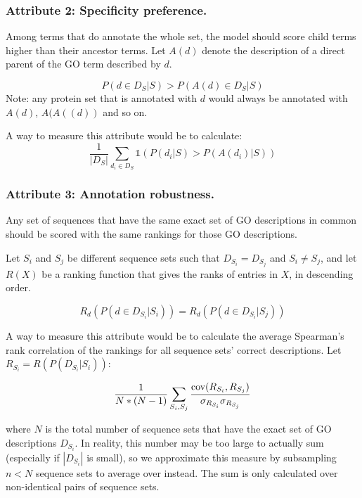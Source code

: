 \documentclass{article}
\begin{document}
        \subsubsection{Attribute 2: Specificity preference.}

        Among terms that do annotate the whole set, the model should score child terms higher than their ancestor terms.
Let $A(d)$ denote the description of a direct parent of the GO term described by $d$.

        \[P(d \in D_{S}| S) > P(A(d) \in D_{S}| S)\]
        Note: any protein set that is annotated with $d$ would always be annotated with $A(d)$, $A(A((d))$ and so on.

        A way to measure this attribute would be to calculate:
        \[\frac{1}{|D_{S}|}\sum_{d_i \in D_{S}} \mathds{1}(P(d_i | S) > P(A(d_i) | S))\]

        \subsubsection{Attribute 3: Annotation robustness.}

        Any set of sequences that have the same exact set of GO descriptions in common should be scored with the same rankings for those GO descriptions.

        Let $S_i$ and $S_j$ be different sequence sets such that $D_{S_i} = D_{S_j}$ and $S_i \neq S_j$, and let $R(X)$ be a ranking function that gives the ranks of entries in $X$, in descending order.

        \[R_{d}(P(d \in D_{S_i} | S_i)) = R_{d}(P(d \in D_{S_i} | S_j))\]

        A way to measure this attribute would be to calculate the average Spearman's rank correlation of the rankings for all sequence sets' correct descriptions.
Let $R_{S_i} = R(P(D_{S_i} | S_i))$:

        \[\frac{1}{N*(N-1)}\sum_{S_i, S_j} \frac{\textnormal{cov}(R_{S_i}, R_{S_j})}{\sigma_{R_{S_i}}\sigma_{R_{S_j}}}\]

        where $N$ is the total number of sequence sets that have the exact set of GO descriptions $D_{S_i}$.
In reality, this number may be too large to actually sum (especially if $|D_{S_i}|$ is small), so we approximate this measure by subsampling $n < N$ sequence sets to average over instead.
The sum is only calculated over non-identical pairs of sequence sets.
\end{document}
